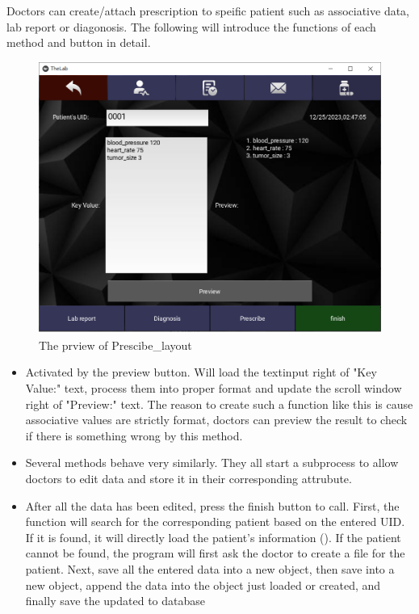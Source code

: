 \documentclass{article}
\begin{document}
Doctors can create/attach prescription to speific patient such as associative 
data, lab report or diagonosis. The following will introduce the functions of 
each method and button in detail.
\begin{figure}[ht]
  \centering
  \includegraphics[scale = 0.3]{asset/doctor_gui/frontend_prescribe.png}
  \caption{The prview of Prescibe\_layout}
  \label{fig:frontend_prescribe}
\end{figure}

\begin{itemize}
  \item {} Activated by the preview button. Will load the textinput right of "Key Value:" text, process them into proper format and update the scroll window right of "Preview:" text. The reason to create such a function like this is cause associative values are strictly format, doctors can preview the result to check if there is something wrong by this method.
  \item {} Several methods behave very similarly. They all start a subprocess to allow doctors to edit data and store it in their corresponding attrubute.
  \item {} After all the data has been edited, press the finish button to call. First, the function will search for the corresponding patient based on the entered UID. If it is found, it will directly load the patient's information (). If the patient cannot be found, the program will first ask the doctor to create a file for the patient. Next, save all the entered data into a new  object, then save  into a new  object, append the data into the  object just loaded or created, and finally save the updated  to database
\end{itemize}
\end{document}
